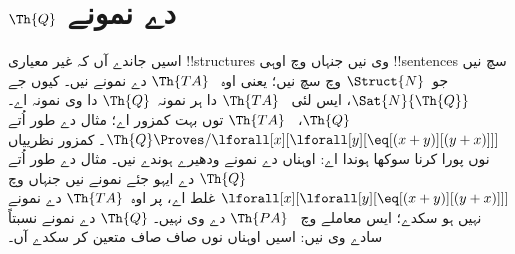 \documentclass[../../../include/open-logic-section]{subfiles}
\begin{document}
\section{$\Th{Q}$ دے نمونے}

\begin{explain}
اسیں جاندے آں کہ غیر معیاری !!{structure}s وی نیں جنہاں وچ اوہی
!!{sentence}s سچ نیں جو~$\Struct{N}$ وچ سچ نیں؛ یعنی اوہ
~$\Th{TA}$ دے نمونے نیں۔ کیوں جے $\Sat{N}{\Th{Q}}$، ایس لئی
~$\Th{TA}$ دا ہر نمونہ~$\Th{Q}$ دا وی نمونہ اے۔ $\Th{Q}$،
~$\Th{TA}$ توں بہت کمزور اے؛ مثال دے طور اُتے
$\Th{Q} \Proves/ \lforall[x][\lforall[y][\eq[(x +
      y)][(y+x)]]]$۔ کمزور نظرییاں نوں پورا کرنا سوکھا ہوندا اے:
اوہناں دے نمونے ودھیرے ہوندے نیں۔ مثال دے طور اُتے $\Th{Q}$ دے
ایہو جئے نمونے نیں جنہاں وچ
$\lforall[x][\lforall[y][\eq[(x + y)][(y+x)]]]$ غلط اے، پر
اوہ~$\Th{TA}$ دے نمونے نہیں ہو سکدے؛ ایس معاملے وچ
~$\Th{PA}$ دے وی نہیں۔ $\Th{Q}$ دے نمونے نسبتاً سادے وی نیں:
اسیں اوہناں نوں صاف صاف متعین کر سکدے آں۔
\end{explain}
\end{document}
